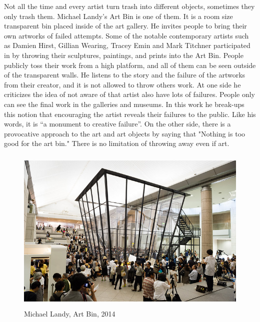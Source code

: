 Not all the time and every artist turn trash into different objects, sometimes they only trash them. Michael Landy's Art Bin is one of them. It is a room size transparent bin placed inside of the art gallery. He invites people to bring their own artworks of failed attempts. Some of the notable contemporary artists such as Damien Hirst, Gillian Wearing, Tracey Emin and Mark Titchner participated in by throwing their sculptures, paintings, and prints into the Art Bin. People publicly toss their work from a high platform, and all of them can be seen outside of the transparent walls. He listens to the story and the failure of the artworks from their creator, and it is not allowed to throw others work. At one side he criticizes the idea of not aware of that artist also have lots of failures. People only can see the final work in the galleries and museums. In this work he break-ups this notion that encouraging the artist reveals their failures to the public. Like his words, it is “a monument to creative failure”. On the other side, there is a provocative approach to the art and art objects by saying that "Nothing is too good for the art bin." There is no limitation of throwing away even if art. 

\begin{figure}[h!]
  \centering
  \includegraphics[height=8cm]{graphics/MichaelLandy_ArtBin.jpg}
  \caption{Michael Landy, Art Bin, 2014}
  \label{fig:MichaelLandy_ArtBin}
\end{figure}


